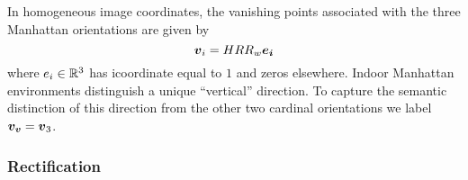 In homogeneous image coordinates, the vanishing points associated with
the three Manhattan orientations are given by
\begin{equation}
  \vpt_i = \CamMatrix \CamR \SceneR \vect{e_i}
\end{equation}
where $e_i \in \Rthree$ has i\th coordinate equal to $1$ and zeros
elsewhere. Indoor Manhattan environments distinguish a unique
``vertical'' direction. To capture the semantic distinction of this
direction from the other two cardinal orientations we label $\vvpt =
\vpt_3$.

\newcommand\worldpt{\vect{v}}
\newcommand\otherworldpt{\vect{u}}
\newcommand\imagept{\vect{p}}
\newcommand\otherimagept{\vect{q}}

\subsubsection{Rectification}

